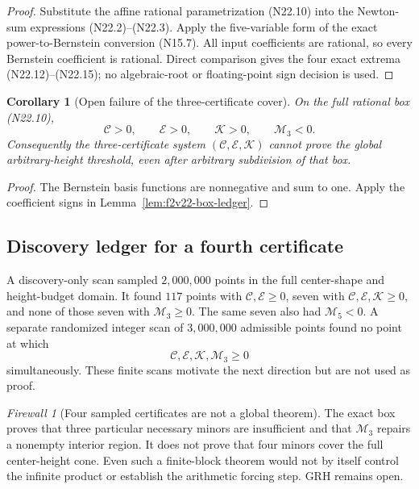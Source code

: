 \documentclass[11pt]{article}
\newtheorem{corollary}[theorem]{Corollary}
\theoremstyle{definition}
\theoremstyle{remark}
\newtheorem{firewall}[theorem]{Firewall}
\begin{document}
\begin{proof}
Substitute the affine rational parametrization \textup{(N22.10)} into the
Newton-sum expressions \textup{(N22.2)}--\textup{(N22.3)}.  Apply the
five-variable form of the exact power-to-Bernstein conversion
\textup{(N15.7)}.  All input coefficients are rational, so every Bernstein
coefficient is rational.  Direct comparison gives the four exact extrema
\textup{(N22.12)}--\textup{(N22.15)}; no algebraic-root or floating-point
sign decision is used.
\end{proof}

\begin{corollary}[Open failure of the three-certificate cover]
\label{cor:f2v22-open-gap}
On the full rational box \textup{(N22.10)},
\[
 \mathcal C>0,\qquad \mathcal E>0,\qquad \mathcal K>0,
 \qquad \mathcal M_3<0.
 \tag{N22.16}
\]
Consequently the three-certificate system
\((\mathcal C,\mathcal E,\mathcal K)\) cannot prove the global
arbitrary-height threshold, even after arbitrary subdivision of that box.
\end{corollary}

\begin{proof}
The Bernstein basis functions are nonnegative and sum to one.  Apply the
coefficient signs in Lemma~\ref{lem:f2v22-box-ledger}.
\end{proof}

\subsection{Discovery ledger for a fourth certificate}
\label{subsec:f2v22-discovery}

A discovery-only scan sampled \(2{,}000{,}000\) points in the full
center-shape and height-budget domain.  It found \(117\) points with
\(\mathcal C,\mathcal E\geq0\), seven with
\(\mathcal C,\mathcal E,\mathcal K\geq0\), and none of those seven with
\(\mathcal M_3\geq0\).  The same seven also had \(\mathcal M_5<0\).
A separate randomized integer scan of \(3{,}000{,}000\) admissible points
found no point at which
\[
 \mathcal C,\mathcal E,\mathcal K,\mathcal M_3\geq0
 \tag{N22.17}
\]
simultaneously.  These finite scans motivate the next direction but are
not used as proof.

\begin{firewall}[Four sampled certificates are not a global theorem]
\label{fire:f2v22}
The exact box proves that three particular necessary minors are
insufficient and that \(\mathcal M_3\) repairs a nonempty interior region.
It does not prove that four minors cover the full center-height cone.
Even such a finite-block theorem would not by itself control the infinite
product or establish the arithmetic forcing step.  GRH remains open.
\end{firewall}
\end{document}
